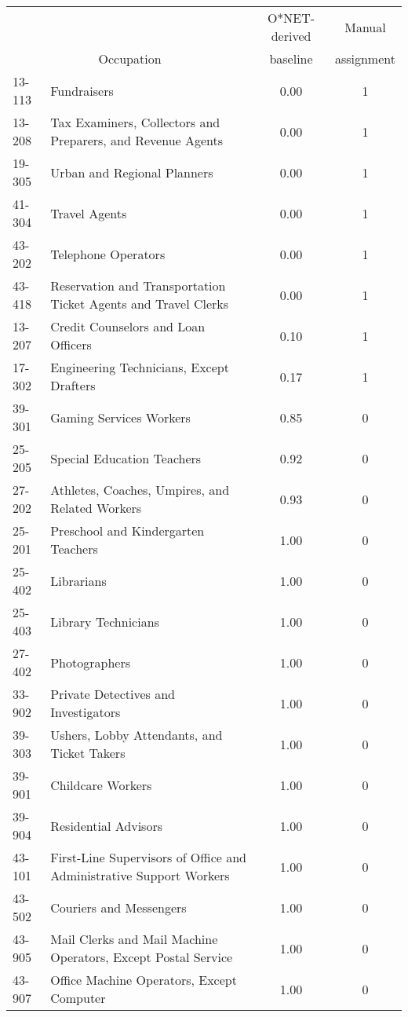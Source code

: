 \begin{tabular}{llcc} \toprule
&&O*NET-derived & Manual\\
\multicolumn{2}{c}{Occupation} & baseline & assignment\\
\midrule
13-113&Fundraisers&0.00&1\\
13-208&Tax Examiners, Collectors and Preparers, and Revenue Agents&0.00&1\\
19-305&Urban and Regional Planners&0.00&1\\
41-304&Travel Agents&0.00&1\\
43-202&Telephone Operators&0.00&1\\
43-418&Reservation and Transportation Ticket Agents and Travel Clerks&0.00&1\\
13-207&Credit Counselors and Loan Officers&0.10&1\\
17-302&Engineering Technicians, Except Drafters&0.17&1\\
39-301&Gaming Services Workers&0.85&0\\
25-205&Special Education Teachers&0.92&0\\
27-202&Athletes, Coaches, Umpires, and Related Workers&0.93&0\\
25-201&Preschool and Kindergarten Teachers&1.00&0\\
25-402&Librarians&1.00&0\\
25-403&Library Technicians&1.00&0\\
27-402&Photographers&1.00&0\\
33-902&Private Detectives and Investigators&1.00&0\\
39-303&Ushers, Lobby Attendants, and Ticket Takers&1.00&0\\
39-901&Childcare Workers&1.00&0\\
39-904&Residential Advisors&1.00&0\\
43-101&First-Line Supervisors of Office and Administrative Support Workers&1.00&0\\
43-502&Couriers and Messengers&1.00&0\\
43-905&Mail Clerks and Mail Machine Operators, Except Postal Service&1.00&0\\
43-907&Office Machine Operators, Except Computer&1.00&0\\
\bottomrule \end{tabular}
